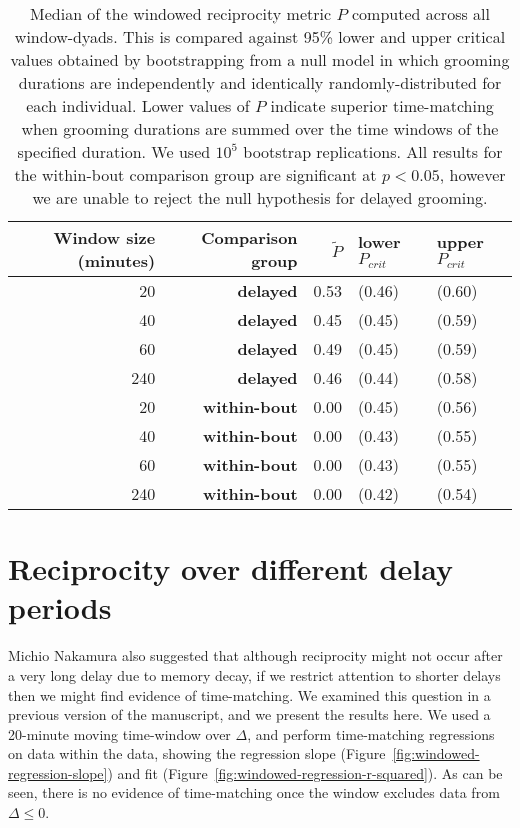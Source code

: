 \documentclass[12pt]{article}
\begin{document}
\begin{table}
\centering
\begin{tabular}{rrrll}
  \hline
 Window size (minutes) & Comparison group &  $\widetilde{P}$ & lower $P_{crit}$ & upper $P_{crit}$  \\
  \hline
20 & \textbf{delayed} & 0.53 & (0.46) & (0.60) \\ 
40 & \textbf{delayed} & 0.45 & (0.45) & (0.59) \\
60 & \textbf{delayed} & 0.49 & (0.45) & (0.59) \\
240 & \textbf{delayed} & 0.46 & (0.44) & (0.58) \\
\hline
20 & \textbf{within-bout} & 0.00 & (0.45) & (0.56) \\ 
40 & \textbf{within-bout} & 0.00 & (0.43) & (0.55) \\ 
60 & \textbf{within-bout} & 0.00 & (0.43) & (0.55) \\
240 & \textbf{within-bout} & 0.00 & (0.42) & (0.54) \\
   \hline
\end{tabular}
\caption{Median of the windowed reciprocity metric $P$ computed across all 
window-dyads.  This is  compared against 95\% lower and upper critical values 
obtained by bootstrapping from a null model in which grooming durations are 
independently and identically randomly-distributed for each individual.  Lower 
values of $P$ indicate superior time-matching when grooming durations are summed 
over the time windows of the specified duration.  We used $10^5$ bootstrap replications. All 
results for the within-bout comparison group are significant at $p<0.05$,
however we are unable to reject the null hypothesis for delayed grooming. \label{table:bootstrap}}
\end{table}

\section{Reciprocity over different delay periods}

Michio Nakamura also suggested that although reciprocity might not occur after a 
very long delay due to memory decay, if we restrict attention to shorter delays 
then we might find evidence of time-matching.  We examined this question in a 
previous version of the manuscript, and we present the results here.  We used a 
20-minute moving time-window over $\Delta$, and perform time-matching regressions on data within the data, showing the regression slope (Figure~\ref{fig:windowed-regression-slope}) and fit (Figure~\ref{fig:windowed-regression-r-squared}). 
As can be seen, there is no evidence of time-matching once the window excludes
data from $\Delta \leq 0$.
\end{document}
